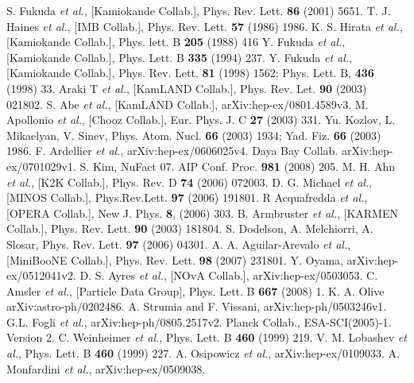 \begin{thebibliography}{99}
S. Fukuda \textit{et al.}, [Kamiokande Collab.], Phys.   Rev. Lett. \textbf{86} (2001) 5651.
T. J. Haines \textit{et al.}, [IMB Collab.], Phys. Rev.  
Lett. \textbf{57} (1986) 1986.
K. S. Hirata \textit{et al.}, [Kamiokande Collab.],  
Phys. lett. B \textbf{205} (1988) 416
Y. Fukuda \textit{et al.}, [Kamiokande Collab.], Phys.  
Lett. B \textbf{335} (1994) 237.
Y. Fukuda \textit{et al.}, [Kamiokande Collab.], Phys.  
Rev. Lett. \textbf{81} (1998) 1562; Phys. Lett. B, \textbf{436}  
(1998) 33.
Araki T \textit{et al.}, [KamLAND Collab.], Phys. Rev.   Let. \textbf{90} (2003) 021802.
S. Abe \textit{et al.}, [KamLAND Collab.],   arXiv:hep-ex/0801.4589v3.
M. Apollonio \textit{et al.}, [Chooz Collab.], Eur.   Phys. J. C \textbf{27} (2003) 331.
Yu. Kozlov, L. Mikaelyan, V. Sinev, Phys. Atom. Nucl.   \textbf{66} (2003) 1934; Yad. Fiz. \textbf{66} (2003) 1986.
F. Ardellier \textit{et al.}, arXiv:hep-ex/0606025v4.
Daya Bay Collab. arXiv:hep-ex/0701029v1.
S. Kim, NuFact 07. AIP Conf. Proc. \textbf{981} (2008)   205.
M. H. Ahn \textit{et al.}, [K2K Collab.], Phys. Rev. D   \textbf{74} (2006) 072003.
D. G. Michael \textit{et al.}, [MINOS Collab.],   Phys.Rev.Lett. \textbf{97} (2006) 191801.
R Acquafredda \textit{et al.}, [OPERA Collab.], New J. Phys. \textbf{8}, (2006) 303.
B. Armbruster \textit{et al.}, [KARMEN Collab.], Phys. Rev. Lett. \textbf{90} (2003) 181804.
S. Dodelson, A. Melchiorri, A. Slosar, Phys. Rev. Lett.   \textbf{97} (2006) 04301.
A. A. Aguilar-Arevalo \textit{et al.}, [MiniBooNE   Collab.], Phys. Rev. Lett. \textbf{98} (2007) 231801.
Y. Oyama, arXiv:hep-ex/0512041v2.
D. S. Ayres \textit{et al.}, [NOvA Collab.],   arXiv:hep-ex/0503053.
C. Amsler \textit{et al.}, [Particle Data Group], Phys. Lett. B \textbf{667} (2008) 1.
K. A. Olive arXiv:astro-ph/0202486.
A. Strumia and F. Vissani, arXiv:hep-ph/0503246v1.
G.L. Fogli \textit{et al.}, arXiv:hep-ph/0805.2517v2.
Planck Collab., ESA-SCI(2005)-1. Version 2.
C. Weinheimer \textit{et al.}, Phys. Lett. B \textbf{460} (1999) 219.
V. M. Lobashev \textit{et al.}, Phys. Lett. B \textbf{460} (1999) 227.
A. Osipowicz \textit{et al.}, arXiv:hep-ex/0109033.
A. Monfardini \textit{et al.}, arXiv:hep-ex/0509038.

\end{thebibliography}
